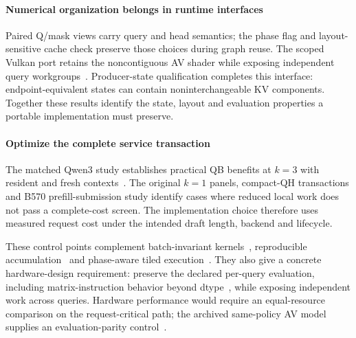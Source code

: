 \paragraph{Numerical organization belongs in runtime interfaces}
Paired Q/mask views carry query and head semantics; the phase flag and layout-sensitive cache check preserve those choices during graph reuse. The scoped Vulkan port retains the noncontiguous AV shader while exposing independent query workgroups~\cite{b570gqarecords}. Producer-state qualification completes this interface: endpoint-equivalent states can contain noninterchangeable KV components. Together these results identify the state, layout and evaluation properties a portable implementation must preserve.

\paragraph{Optimize the complete service transaction}
The matched Qwen3 study establishes practical QB benefits at $k=3$ with resident and fresh contexts~\cite{rtxnativebridge}. The original $k=1$ panels, compact-QH transactions and B570 prefill-submission study identify cases where reduced local work does not pass a complete-cost screen. The implementation choice therefore uses measured request cost under the intended draft length, backend and lifecycle.

These control points complement batch-invariant kernels~\cite{thinkingmachines}, reproducible accumulation~\cite{reproblas} and phase-aware tiled execution~\cite{spectra}. They also give a concrete hardware-design requirement: preserve the declared per-query evaluation, including matrix-instruction behavior beyond dtype~\cite{ptx}, while exposing independent work across queries. Hardware performance would require an equal-resource comparison on the request-critical path; the archived same-policy AV model supplies an evaluation-parity control~\cite{studyrecords}.
